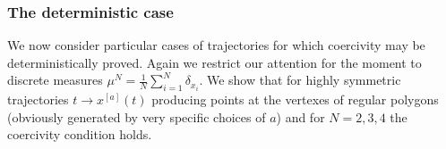 


\subsubsection{The deterministic case}

We now consider particular cases of trajectories for which coercivity may be {deterministically} proved. {Again we restrict our attention for the moment to discrete  measures $\mu^N=\frac1N\sum_{i=1}^N\delta_{x_i}$. We show that for highly symmetric trajectories $t \to x^{[a]}(t)$ producing points at the vertexes of regular polygons (obviously generated by very specific choices of $a$) and for $N=2,3,4$ the coercivity condition holds.}


